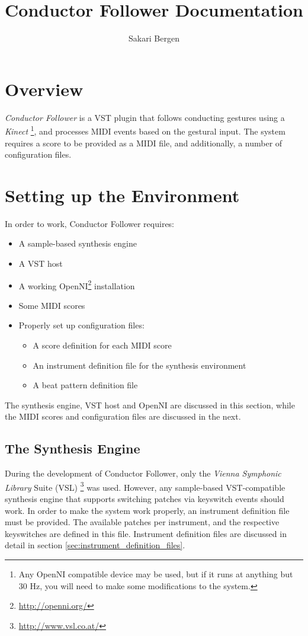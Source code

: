 \documentclass[12pt,a4paper]{article}
\author{Sakari Bergen}
\title{Conductor Follower Documentation}
\newcommand{\CF}{Conductor Follower}
\begin{document}
\maketitle

\tableofcontents

\section{Overview}

\textit{\CF{}} is a VST plugin that follows conducting gestures using a \textit{Kinect}%
\footnote{Any OpenNI compatible device may be used,
but if it runs at anything but 30 Hz,
you will need to make some modifications to the system.},
and processes MIDI events based on the gestural input.
The system requires a score to be provided as a MIDI file,
and additionally, a number of configuration files.

\section{Setting up the Environment}

In order to work, \CF{} requires:
\begin{itemize}
\item A sample-based synthesis engine
\item A VST host
\item A working OpenNI\footnote{\url{http://openni.org/}} installation
\item Some MIDI scores
\item Properly set up configuration files:
\begin{itemize}
\item A score definition for each MIDI score
\item An instrument definition file for the synthesis environment
\item A beat pattern definition file
\end{itemize}
\end{itemize}
The synthesis engine, VST host and OpenNI are discussed in this section,
while the MIDI scores and configuration files
are discussed in the next.

\subsection{The Synthesis Engine}

During the development of \CF{},
only the \textit{Vienna Symphonic Library} Suite (VSL)%
\footnote{\url{http://www.vsl.co.at/}}
was used.
However, any sample-based VST-compatible synthesis engine
that supports switching patches via keyswitch events should work.
In order to make the system work properly,
an instrument definition file must be provided.
The available patches per instrument,
and the respective keyswitches are defined in this file.
Instrument definition files are discussed in detail in section
\ref{sec:instrument_definition_files}.
\end{document}
